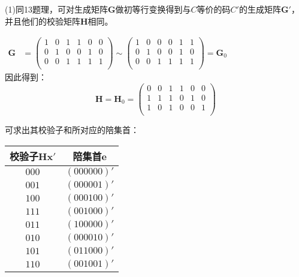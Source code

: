 \begin{Solution}
    (1)同13题理，可对生成矩阵$\bm{G}$做初等行变换得到与$C$等价的码$C'$的生成矩阵$\bm{G}'$，并且他们的校验矩阵$\bm{H}$相同。

    $
    \begin{aligned}
        \bm{G} &= \left(
        \begin{matrix}
            1 &0 &1 &1 &0 &0\\
            0 &1 &0 &0 &1 &0\\
            0 &0 &1 &1 &1 &1\\
        \end{matrix}
    \right)
    \sim
    \left(
        \begin{matrix}
            1 &0 &0 &0 &1 &1\\
            0 &1 &0 &0 &1 &0\\
            0 &0 &1 &1 &1 &1\\
        \end{matrix}
    \right)
    = \bm{G}_0
    \end{aligned}
    $\\

    因此得到：
    \begin{equation}
        \bm{H} = \bm{H}_0=
        \left(
            \begin{matrix}
                0 &0 &1 &1 &0 &0\\
                1 &1 &1 &0 &1 &0\\
                1 &0 &1 &0 &0 &1\\
            \end{matrix}
        \right)
    \end{equation}

    可求出其校验子和所对应的陪集首：

    \begin{center}
        \begin{tabular}{cc}
            \toprule
            校验子$\bm{Hx}'$ & 陪集首$\bm{e}$ \\
            \midrule
            $000$ & $(000000)'$\\
            $001$ & $(000001)'$\\
            $100$ & $(000100)'$\\
            $111$ & $(001000)'$\\
            $011$ & $(100000)'$\\
            \hdashline
            $010$ & $(000010)'$\\
            $101$ & $(011000)'$                 \\
            $110$ & $(001001)'$                 \\
            \bottomrule
        \end{tabular}
    \end{center}


\end{Solution}
